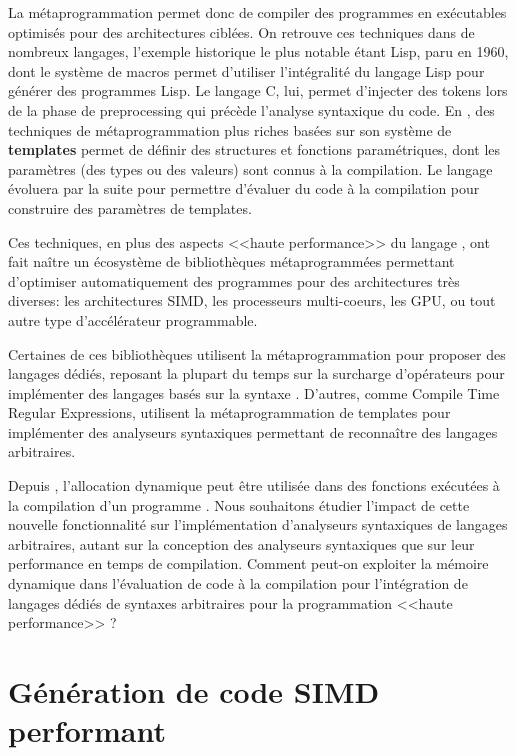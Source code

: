 \documentclass[main]{subfiles}
\begin{document}
La m\'etaprogrammation permet donc de compiler des programmes en ex\'ecutables
optimis\'es pour des architectures cibl\'ees. On retrouve ces techniques
dans de nombreux langages, l'exemple historique le plus notable \'etant
Lisp, paru en 1960, dont le syst\`eme de macros permet d'utiliser
l'int\'egralit\'e du langage Lisp pour g\'en\'erer des programmes Lisp.
Le langage C, lui, permet d'injecter des tokens lors de la phase de
preprocessing qui pr\'ec\`ede l'analyse syntaxique du code. En \cpp,
des techniques de m\'etaprogrammation plus riches bas\'ees sur son syst\`eme de
\textbf{templates} permet de d\'efinir des structures et fonctions
param\'etriques, dont les param\`etres (des types ou des valeurs) sont
connus \`a la compilation. Le langage \'evoluera par la suite pour permettre
d'\'evaluer du code \cpp \`a la compilation pour construire des param\`etres de
templates.

Ces techniques, en plus des aspects <<haute performance>> du langage \cpp,
ont fait na\^itre un \'ecosyst\`eme de biblioth\`eques m\'etaprogramm\'ees
permettant d'optimiser automatiquement des programmes pour des architectures
tr\`es diverses: les architectures SIMD, les processeurs multi-coeurs, les GPU,
ou tout autre type d'acc\'el\'erateur programmable.

Certaines de ces biblioth\`eques utilisent la m\'etaprogrammation pour proposer
des langages d\'edi\'es, reposant la plupart du temps sur la surcharge
d'op\'erateurs pour impl\'ementer des langages bas\'es sur la syntaxe \cpp.
D'autres, comme Compile Time Regular Expressions, utilisent
la m\'etaprogrammation de templates pour impl\'ementer des analyseurs
syntaxiques permettant de reconna\^itre des langages arbitraires.

Depuis , l'allocation dynamique peut \^etre utilis\'ee dans des fonctions
ex\'ecut\'ees \`a la compilation d'un programme \cpp. Nous souhaitons \'etudier
l'impact de cette nouvelle fonctionnalit\'e sur l'impl\'ementation d'analyseurs
syntaxiques de langages arbitraires, autant sur la conception des analyseurs
syntaxiques que sur leur performance en temps de compilation.
Comment peut-on exploiter la m\'emoire dynamique dans l'\'evaluation de code
\cpp \`a la compilation pour l'int\'egration de langages d\'edi\'es de syntaxes
arbitraires pour la programmation <<haute performance>> ?

\section{
  G\'en\'eration de code SIMD performant
}
\end{document}
